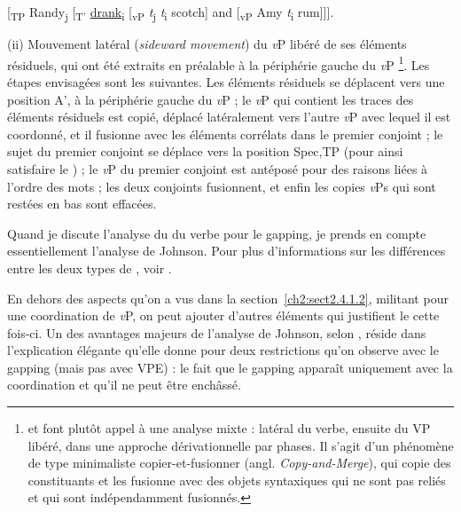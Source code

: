 \ea \label{ch2:ex213} 
{} [\textsubscript{TP} Randy\textsubscript{j} [\textsubscript{T’} \uline{drank}\textsubscript{i} [\textsubscript{vP} \textit{t}\textsubscript{j}\textit{ t}\textsubscript{i} scotch] and [\textsubscript{vP} Amy \textit{t}\textsubscript{i} rum]]]. \citep{Johnson2009}  
\z

(ii) Mouvement latéral (\textit{sideward movement}) du \textit{v}P libéré de ses éléments résiduels, qui ont été extraits en préalable à la périphérie gauche du \textit{v}P \citep{LopezEtAl2003,AgbayaniEtAl2004,Winkler2005}\footnote{\citet{LopezEtAl2003} et \citet{Winkler2005} font plutôt appel à une analyse mixte :  latéral du verbe, ensuite  du VP libéré, dans une approche dérivationnelle par phases. Il s’agit d’un phénomène de type minimaliste copier-et-fusionner (angl. \textit{Copy-and-Merge}), qui copie des constituants et les fusionne avec des objets syntaxiques qui ne sont pas reliés et qui sont indépendamment fusionnés.}. Les étapes envisagées sont les suivantes. Les éléments résiduels se déplacent vers une position A’, à la périphérie gauche du \textit{v}P ; le \textit{v}P qui contient les traces des éléments résiduels est copié, déplacé latéralement vers l’autre \textit{v}P avec lequel il est coordonné, et il fusionne avec les éléments corrélats dans le premier conjoint ; le sujet du premier conjoint se déplace vers la position Spec,TP (pour ainsi satisfaire le ) ; le \textit{v}P du premier conjoint est antéposé pour des raisons liées à l’ordre des mots ; les deux conjoints fusionnent, et enfin les copies \textit{v}Ps qui sont restées en bas sont effacées. 

Quand je discute l’analyse du  du verbe pour le gapping, je prends en compte essentiellement l’analyse de Johnson. Pour plus d’informations sur les différences entre les deux types de , voir \citet{Winkler2005}.

En dehors des aspects qu’on a vus dans la section~\ref{ch2:sect2.4.1.2}, militant pour une coordination de \textit{v}P, on peut ajouter d’autres éléments qui justifient le  cette fois-ci. Un des avantages majeurs de l’analyse de Johnson, selon \citet{Vicente2010}, réside dans l’explication élégante qu’elle donne pour deux restrictions qu’on observe avec le gapping (mais pas avec VPE) : le fait que le gapping apparaît uniquement avec la coordination et qu’il ne peut être enchâssé.  

